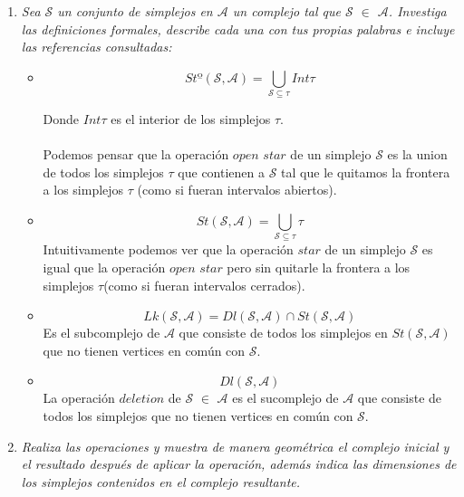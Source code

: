 \documentclass{article}
\begin{document}
\begin{enumerate}
  \item{
      \textsl{
    Sea $\mathcal{S}$ un conjunto de simplejos en $\mathcal{A}$ un
    complejo tal que $\mathcal{S}$ $\in$ $\mathcal{A}$. Investiga las
    definiciones formales, describe cada una con tus propias palabras
    e incluye las referencias consultadas:
    }
    \begin{itemize}
      
    \item{
          \[
           Stº(\mathcal{S}, \mathcal{A}) =  \bigcup_{\mathcal{S}
             \subseteq \tau} Int \tau 
          \]

          Donde $Int\tau$ es el interior de los simplejos $\tau$.\\\\
          Podemos pensar que la operación $open$ $star$ de un simplejo
          $\mathcal{S}$ es la union de
          todos los simplejos $\tau$ que contienen a $\mathcal{S}$
          tal que le quitamos la frontera a los simplejos $\tau$
          (como si fueran intervalos abiertos).
      }
      
    \item{
        \[
           St(\mathcal{S}, \mathcal{A}) =  \bigcup_{\mathcal{S}
             \subseteq \tau} \tau 
           \]
           Intuitivamente podemos ver que la operación $star$ de un
           simplejo $\mathcal{S}$ es igual que la operación $open$
           $star$ pero sin quitarle la frontera a los simplejos
           $\tau$(como si fueran intervalos cerrados).
         }

    \item{
        \[
        Lk(\mathcal{S}, \mathcal{A}) = Dl(\mathcal{S},\mathcal{A}) \cap
        St(\mathcal{S}, \mathcal{A})
        \]
        Es el subcomplejo de $\mathcal{A}$ que consiste de todos los
        simplejos en $St(\mathcal{S},\mathcal{A})$ que no tienen
        vertices en común con $\mathcal{S}$.
      }

    \item{
        \[
        Dl(\mathcal{S},\mathcal{A})
        \]
        La operación $deletion$ de $\mathcal{S}$ $\in$ $\mathcal{A}$
        es el sucomplejo de $\mathcal{A}$ que consiste de todos los
        simplejos que no tienen vertices en común con $\mathcal{S}$.
        }
    \end{itemize}

  
  }

\item{
    \textsl{
      Realiza las operaciones y muestra de manera geométrica el
      complejo inicial y el resultado después de aplicar la operación,
      además indica las dimensiones de los simplejos contenidos en el
      complejo resultante.
    }

}
\end{enumerate}
\end{document}
